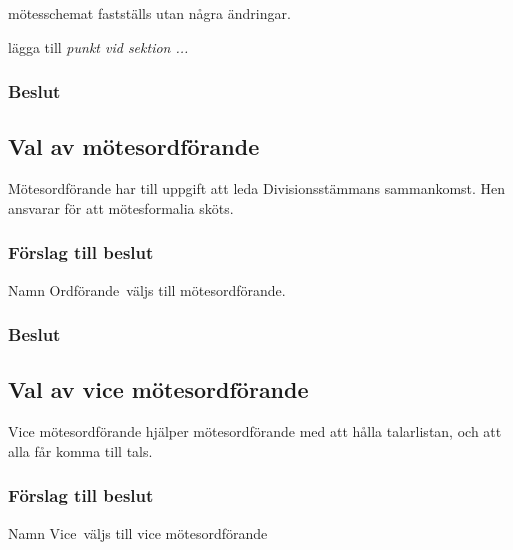 \documentclass[protokoll]{dvd}
\def\ordf{Namn Ordförande}
\def\vice{Namn Vice}
\begin{document}
\begin{attsatser}
    \item mötesschemat fastställs utan några ändringar.
    \item lägga till \textit{punkt vid sektion ...}
\end{attsatser}

\subsubsection*{Beslut}
\begin{attsatser}
    \item %
\end{attsatser}

\subsection{Val av mötesordförande}

Mötesordförande har till uppgift att leda Divisionsstämmans sammankomst.
Hen ansvarar för att mötesformalia sköts.



\subsubsection*{Förslag till beslut}
\begin{attsatser}
    \item \ordf\ väljs till mötesordförande.
\end{attsatser}

\subsubsection*{Beslut}
\begin{attsatser}
    \item %
\end{attsatser}

\subsection{Val av vice mötesordförande}

Vice mötesordförande hjälper mötesordförande med att hålla talarlistan, och att alla får komma till tals.

\subsubsection*{Förslag till beslut}
\begin{attsatser}
    \item \vice\ väljs till vice mötesordförande
\end{attsatser}
\end{document}
